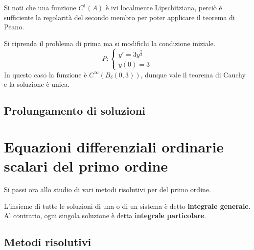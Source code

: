 \begin{oss}
    Si noti che una funzione $C^1(A)$ è ivi localmente Lipschitziana, perciò  è sufficiente la regolarità del secondo membro per poter applicare il teorema di Peano.
\end{oss}
\begin{example}
    Si riprenda il problema di prima ma si modifichi la condizione iniziale.
    \begin{equation*}
        P: \begin{cases}
        y'=3y^{\frac{2}{3}}\\
        y(0)=3
    \end{cases}
    \end{equation*}
    In questo caso la funzione è $C^\infty(B_\delta(0,3))$, dunque vale il teorema di Cauchy e la soluzione è unica.
\end{example}
\subsection{Prolungamento di soluzioni}


\section{Equazioni differenziali ordinarie scalari del primo ordine}
Si passi ora allo studio di vari metodi risolutivi per \odes del primo ordine. 
\begin{definition}
    L'insieme di tutte le soluzioni di una \ode o di un sistema è detto \textbf{integrale generale}. Al contrario, ogni singola soluzione è detta \textbf{integrale particolare}.
\end{definition}
\subsection{Metodi risolutivi}
